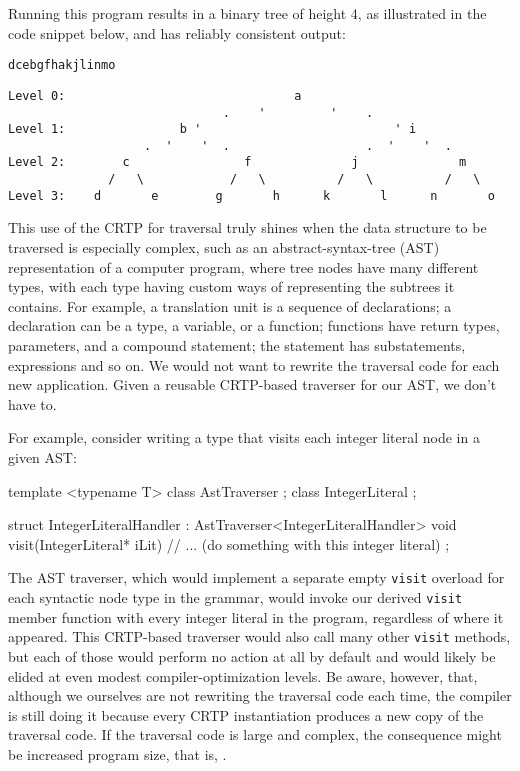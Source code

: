 \noindent Running this program results in a binary tree of height 4, as
illustrated in the code snippet below, and has reliably consistent output:

\begin{lstlisting}[style=plain]
dcebgfhakjlinmo
\end{lstlisting}
    
\begin{lstlisting}[style=plain]
Level 0:                                a
                              .    '         '    .
Level 1:                b '                           ' i
                   .  '    '  .                   .  '    '  .
Level 2:        c                f              j              m
              /   \            /   \          /   \          /   \
Level 3:    d       e        g       h      k       l      n       o
\end{lstlisting}
    
\noindent This use of the CRTP for traversal truly shines when the data structure to
be traversed is especially complex, such as an abstract-syntax-tree
(AST) representation of a computer program, where tree nodes have many
different types, with each type having custom ways of representing the
subtrees it contains. For example, a translation unit is a sequence of
declarations; a declaration can be a type, a variable, or a function;
functions have return types, parameters, and a compound statement; the
statement has substatements, expressions and so on. We would not want
to rewrite the traversal code for each new application. Given a reusable
CRTP-based traverser for our AST, we don't have to.

For example, consider writing a type that visits each integer literal
node in a given AST:

\begin{emcppshiddenlisting}[emcppsbatch=e10]
template <typename T>
class AstTraverser {};
class IntegerLiteral {};
\end{emcppshiddenlisting}
\begin{emcppslisting}[emcppsbatch=e10]
struct IntegerLiteralHandler : AstTraverser<IntegerLiteralHandler>
{
    void visit(IntegerLiteral* iLit)
    {
        // ... (do something with this integer literal)
    }
};
\end{emcppslisting}
    
\noindent The AST traverser, which would implement a separate empty \lstinline!visit!
overload for each syntactic node type in the grammar, would invoke our
derived \lstinline!visit! member function with every integer literal in the
program, regardless of where it appeared. This CRTP-based traverser
would also call many other \lstinline!visit! methods, but each of those would perform no action at all by default and would likely be elided at even modest compiler-optimization levels. Be aware, however, that, although we ourselves are
not rewriting the traversal code each time, the compiler is still doing
it because every CRTP instantiation produces a new copy of the traversal
code. If the traversal code is large and complex, the consequence might
be increased program size, that is, \romeogloss{code bloat}.

